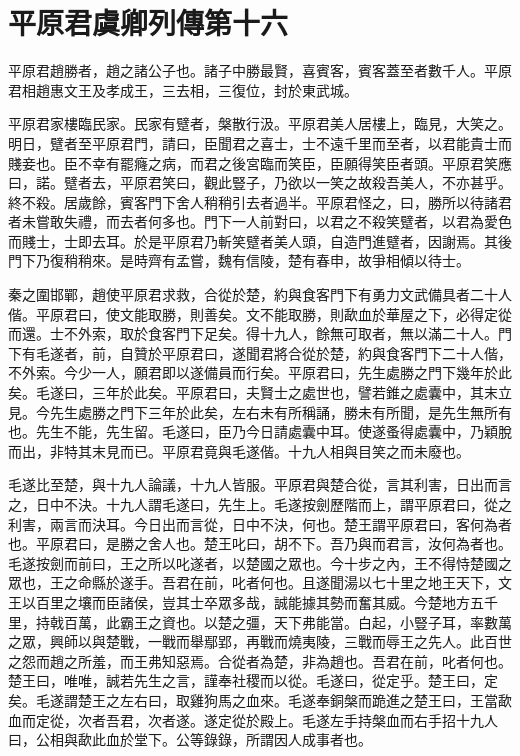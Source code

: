 \chapter{平原君虞卿列傳第十六}

平原君趙勝者，趙之諸公子也。諸子中勝最賢，喜賓客，賓客蓋至者數千人。平原君相趙惠文王及孝成王，三去相，三復位，封於東武城。

平原君家樓臨民家。民家有躄者，槃散行汲。平原君美人居樓上，臨見，大笑之。明日，躄者至平原君門，請曰，臣聞君之喜士，士不遠千里而至者，以君能貴士而賤妾也。臣不幸有罷癃之病，而君之後宮臨而笑臣，臣願得笑臣者頭。平原君笑應曰，諾。躄者去，平原君笑曰，觀此豎子，乃欲以一笑之故殺吾美人，不亦甚乎。終不殺。居歲餘，賓客門下舍人稍稍引去者過半。平原君怪之，曰，勝所以待諸君者未嘗敢失禮，而去者何多也。門下一人前對曰，以君之不殺笑躄者，以君為愛色而賤士，士即去耳。於是平原君乃斬笑躄者美人頭，自造門進躄者，因謝焉。其後門下乃復稍稍來。是時齊有孟嘗，魏有信陵，楚有春申，故爭相傾以待士。

秦之圍邯鄲，趙使平原君求救，合從於楚，約與食客門下有勇力文武備具者二十人偕。平原君曰，使文能取勝，則善矣。文不能取勝，則歃血於華屋之下，必得定從而還。士不外索，取於食客門下足矣。得十九人，餘無可取者，無以滿二十人。門下有毛遂者，前，自贊於平原君曰，遂聞君將合從於楚，約與食客門下二十人偕，不外索。今少一人，願君即以遂備員而行矣。平原君曰，先生處勝之門下幾年於此矣。毛遂曰，三年於此矣。平原君曰，夫賢士之處世也，譬若錐之處囊中，其末立見。今先生處勝之門下三年於此矣，左右未有所稱誦，勝未有所聞，是先生無所有也。先生不能，先生留。毛遂曰，臣乃今日請處囊中耳。使遂蚤得處囊中，乃穎脫而出，非特其末見而已。平原君竟與毛遂偕。十九人相與目笑之而未廢也。

毛遂比至楚，與十九人論議，十九人皆服。平原君與楚合從，言其利害，日出而言之，日中不決。十九人謂毛遂曰，先生上。毛遂按劍歷階而上，謂平原君曰，從之利害，兩言而決耳。今日出而言從，日中不決，何也。楚王謂平原君曰，客何為者也。平原君曰，是勝之舍人也。楚王叱曰，胡不下。吾乃與而君言，汝何為者也。毛遂按劍而前曰，王之所以叱遂者，以楚國之眾也。今十步之內，王不得恃楚國之眾也，王之命縣於遂手。吾君在前，叱者何也。且遂聞湯以七十里之地王天下，文王以百里之壤而臣諸侯，豈其士卒眾多哉，誠能據其勢而奮其威。今楚地方五千里，持戟百萬，此霸王之資也。以楚之彊，天下弗能當。白起，小豎子耳，率數萬之眾，興師以與楚戰，一戰而舉鄢郢，再戰而燒夷陵，三戰而辱王之先人。此百世之怨而趙之所羞，而王弗知惡焉。合從者為楚，非為趙也。吾君在前，叱者何也。楚王曰，唯唯，誠若先生之言，謹奉社稷而以從。毛遂曰，從定乎。楚王曰，定矣。毛遂謂楚王之左右曰，取雞狗馬之血來。毛遂奉銅槃而跪進之楚王曰，王當歃血而定從，次者吾君，次者遂。遂定從於殿上。毛遂左手持槃血而右手招十九人曰，公相與歃此血於堂下。公等錄錄，所謂因人成事者也。

